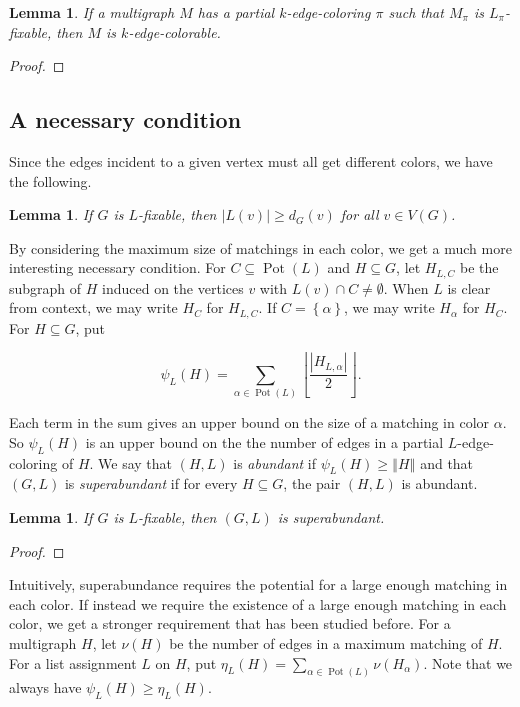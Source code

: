 \documentclass[12pt]{article}
\theoremstyle{plain}
\newtheorem{lem}[thm]{Lemma}
\theoremstyle{definition}
\theoremstyle{remark}
\newcommand{\set}[1]{\left\{ #1 \right\}}
\newcommand{\card}[1]{\left|#1\right|}
\newcommand{\size}[1]{\left\Vert#1\right\Vert}
\newcommand{\floor}[1]{\left\lfloor#1\right\rfloor}
\newcommand{\pot}{\operatorname{Pot}}
\begin{document}
\begin{lem}\label{FixableCompletesColoring}
If a multigraph $M$ has a partial $k$-edge-coloring $\pi$ such that $M_\pi$ is $L_\pi$-fixable, then $M$ is $k$-edge-colorable.
\end{lem}
\begin{proof}
\end{proof}

\subsection{A necessary condition}
Since the edges incident to a given vertex must all get different colors, we have the following.

\begin{lem}\label{DegreeNecessaryCondition}
If $G$ is $L$-fixable, then $|L(v)| \ge d_G(v)$ for all $v \in V(G)$.
\end{lem}

By considering the maximum size of matchings in each color, we get a much more interesting necessary condition.
For $C \subseteq \pot(L)$ and $H \subseteq G$, let $H_{L, C}$ be the
subgraph of $H$ induced on the vertices $v$ with $L(v) \cap C \ne \emptyset$. 
When $L$ is clear from context, we may write $H_C$ for $H_{L,C}$. If $C =
\set{\alpha}$, we may write $H_\alpha$ for $H_C$.  For $H \subseteq G$, put

\[\psi_L(H) = \sum_{\alpha \in \pot(L)} \floor{\frac{\card{H_{L, \alpha}}}{2}}.\]

Each term in the sum gives an upper bound on the size of a matching in color
$\alpha$. So $\psi_L(H)$ is an upper bound on the the number of edges in a
partial $L$-edge-coloring of $H$.  We say that $(H, L)$ is \emph{abundant} if
$\psi_L(H) \ge \size{H}$ and that $(G,L)$ is \emph{superabundant} if for every
$H \subseteq G$, the pair $(H, L)$ is abundant.  

\begin{lem}\label{SuperabundanceIsNecessary}
If $G$ is $L$-fixable, then $(G, L)$ is superabundant.
\end{lem}
\begin{proof}
\end{proof}

Intuitively, superabundance requires the potential for a large enough matching in each color. If instead we require the existence of a large enough matching in each color, we get a stronger requirement that has been studied before. For a multigraph $H$, let $\nu(H)$ be the number of edges in a maximum matching of $H$. 
For a list assignment $L$ on $H$, put $\eta_L(H) = \sum_{\alpha \in \pot(L)} \nu(H_\alpha)$.  Note that we always have $\psi_L(H) \ge \eta_L(H)$.
\end{document}
